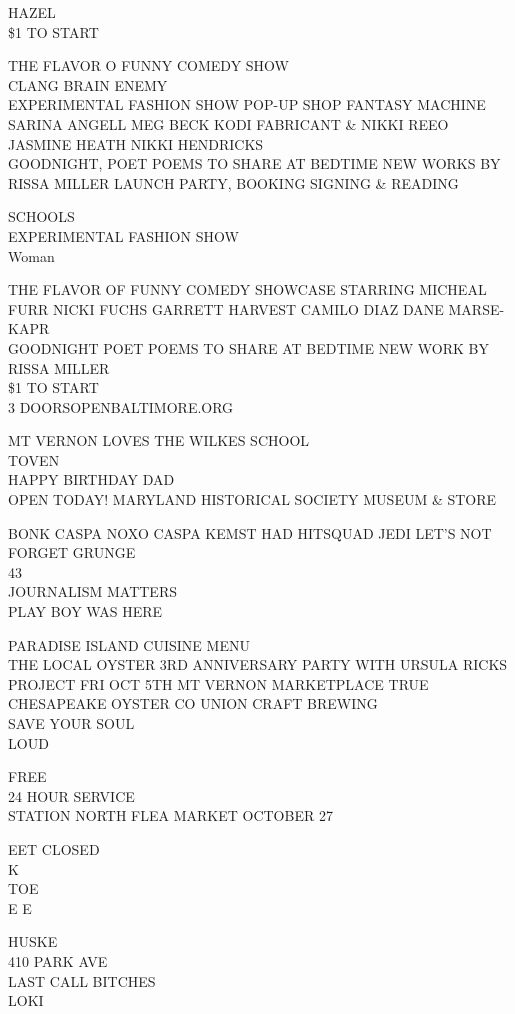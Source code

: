\documentclass[10pt,letterpaper]{article}
\begin{document}
HAZEL\\
\$1 TO START

THE FLAVOR O FUNNY COMEDY SHOW\\
CLANG BRAIN ENEMY\\
EXPERIMENTAL FASHION SHOW POP{-}UP SHOP FANTASY MACHINE SARINA ANGELL MEG BECK KODI FABRICANT \& NIKKI  REEO JASMINE HEATH NIKKI HENDRICKS\\
GOODNIGHT, POET POEMS TO SHARE AT BEDTIME NEW WORKS BY RISSA MILLER LAUNCH PARTY, BOOKING SIGNING \& READING

SCHOOLS\\
EXPERIMENTAL FASHION SHOW\\
Woman

THE FLAVOR OF FUNNY COMEDY SHOWCASE STARRING MICHEAL FURR NICKI FUCHS GARRETT HARVEST CAMILO DIAZ DANE MARSE{-}KAPR\\
GOODNIGHT POET POEMS TO SHARE AT BEDTIME NEW WORK BY RISSA MILLER\\
\$1 TO START\\
3 DOORSOPENBALTIMORE.ORG

MT VERNON LOVES THE WILKES SCHOOL\\
TOVEN\\
HAPPY BIRTHDAY DAD\\
OPEN TODAY!  MARYLAND HISTORICAL SOCIETY MUSEUM \& STORE

BONK CASPA NOXO CASPA KEMST HAD HITSQUAD JEDI LET'S NOT FORGET GRUNGE\\
43\\
JOURNALISM MATTERS\\
PLAY BOY WAS HERE

PARADISE ISLAND CUISINE MENU\\
THE LOCAL OYSTER 3RD ANNIVERSARY PARTY WITH URSULA RICKS PROJECT FRI OCT 5TH MT VERNON MARKETPLACE TRUE CHESAPEAKE OYSTER CO UNION CRAFT BREWING\\
SAVE YOUR SOUL\\
LOUD

FREE\\
24 HOUR SERVICE\\
STATION NORTH FLEA MARKET OCTOBER 27

EET CLOSED\\
K\\
TOE\\
E E

HUSKE\\
410 PARK AVE\\
LAST CALL BITCHES\\
LOKI
\end{document}
